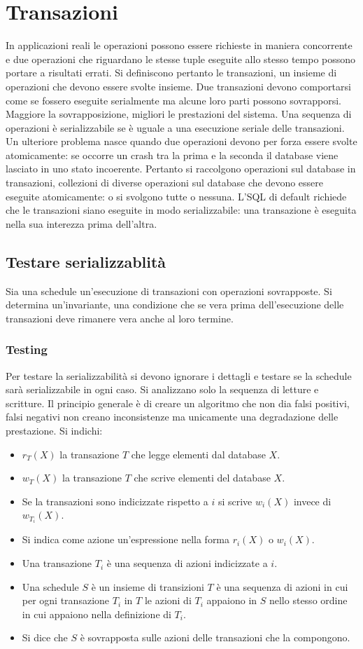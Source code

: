 \chapter{Transazioni}
In applicazioni reali le operazioni possono essere richieste in maniera concorrente e due operazioni che riguardano le stesse tuple eseguite allo stesso tempo possono portare a risultati errati. Si definiscono 
pertanto le transazioni, un insieme di operazioni che devono essere svolte insieme. Due transazioni devono comportarsi come se fossero eseguite serialmente ma alcune loro parti possono sovrapporsi. Maggiore
la sovrapposizione, migliori le prestazioni del sistema. Una sequenza di operazioni \`e serializzabile se \`e uguale a una esecuzione seriale delle transazioni. Un ulteriore problema nasce quando due operazioni
devono per forza essere svolte atomicamente: se occorre un crash tra la prima e la seconda il database viene lasciato in uno stato incoerente. Pertanto si raccolgono operazioni sul database in transazioni, 
collezioni di diverse operazioni sul database che devono essere eseguite atomicamente: o si svolgono tutte o nessuna. L'SQL di default richiede che le transazioni siano eseguite in modo serializzabile: una 
transazione \`e eseguita nella sua interezza prima dell'altra. 
\section{Testare serializzablit\`a}
Sia una schedule un'esecuzione di transazioni con operazioni sovrapposte. Si determina un'invariante, una condizione che se vera prima dell'esecuzione delle transazioni deve rimanere vera anche al loro termine.
\subsection{Testing}
Per testare la serializzabilit\`a si devono ignorare i dettagli e testare se la schedule sar\`a serializzabile in ogni caso. Si analizzano solo la sequenza di letture e scritture. Il principio generale \`e di creare un
algoritmo che non dia falsi positivi, falsi negativi non creano inconsistenze ma unicamente una degradazione delle prestazione. Si indichi:
\begin{itemize}
\item $r_T(X)$ la transazione $T$ che legge elementi dal database $X$.
\item $w_T(X)$ la transazione $T$ che scrive elementi del database $X$.
\item Se la transazioni sono indicizzate rispetto a $i$ si scrive $w_i(X)$ invece di $w_{T_i}(X)$.
\item Si indica come azione un'espressione nella forma $r_i(X)$ o $w_i(X)$. 
\item Una transazione $T_i$ \`e una sequenza di azioni indicizzate a $i$.
\item Una schedule $S$ \`e un insieme di transizioni $T$ \`e una sequenza di azioni in cui per ogni transazione $T_i$ in $T$ le azioni di $T_i$ appaiono in $S$ nello stesso ordine in cui appaiono nella definizione
di $T_i$.
\item Si dice che $S$ \`e sovrapposta sulle azioni delle transazioni che la compongono.
\end{itemize}
